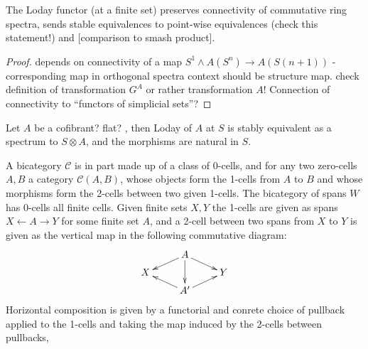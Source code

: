     \begin{lem}\label{lem_loday_functor_preserves_connectivity}
      The Loday functor (at a finite set) preserves connectivity of commutative ring spectra, sends stable equivalences to point-wise equivalences (check this statement!) and [comparison to smash product].
      \begin{proof}
        depends on connectivity of a map $S^1 \wedge A(S^n) \to A(S(n+1))$ - corresponding map in orthogonal spectra context should be structure map. check definition of transformation $G^A$ or rather transformation $A$! Connection of connectivity to ``functors of simplicial sets''?
      \end{proof}
    \end{lem}

    \begin{cor}\label{cor_loday_at_S_naturally_equivalent_to_tensor_with_S}
      Let $A$ be a cofibrant? flat? \hring, then Loday of $A$ at $S$ is stably equivalent as a spectrum to $S \otimes A$, and the morphisms are natural in $S$.
    \end{cor}


    A bicategory $\mathcal{C}$ is in part made up of a class of 0-cells, and for any two zero-cells $A,B$ a category $\mathcal{C}(A,B)$, whose objects form the 1-cells from $A$ to $B$ and whose morphisms form the 2-cells between two given 1-cells. The bicategory of spans $W$ has 0-cells all finite cells. Given finite sets $X,Y$ the 1-cells are given as spans $ X \leftarrow A \rightarrow Y$ for some finite set $A$, and a 2-cell between two spans from $X$ to $Y$  is given as the vertical map in the following commutative diagram:
    \[
    \xymatrix@R-=.5em{
      &
      A \ar[dl] \ar[dd] \ar[dr]
      \\
      X
      &
      &
      Y
      \\
      &
      A^\prime \ar[ul] \ar[ur]
      &
    }
    \]
    Horizontal composition is given by a functorial and conrete choice of pullback applied to the 1-cells and taking the map induced by the 2-cells between pullbacks,


